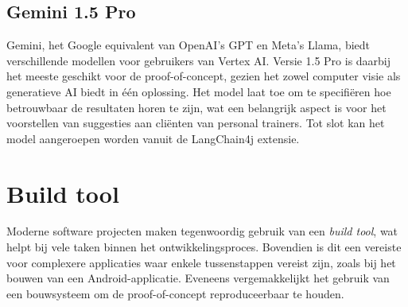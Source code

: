 \subsection{Gemini 1.5 Pro}
\label{subsec:gemini-1.5-pro}
Gemini, het Google equivalent van OpenAI's GPT en Meta's Llama, biedt verschillende modellen voor gebruikers van Vertex AI\@.
Versie 1.5 Pro is daarbij het meeste geschikt voor de proof-of-concept, gezien het zowel computer visie als generatieve AI biedt in één oplossing.
Het model laat toe om te specifiëren hoe betrouwbaar de resultaten horen te zijn, wat een belangrijk aspect is voor het voorstellen van suggesties aan cliënten van personal trainers.
Tot slot kan het model aangeroepen worden vanuit de LangChain4j extensie.

\section{Build tool}
\label{sec:build-tool}
Moderne software projecten maken tegenwoordig gebruik van een \textit{build tool}, wat helpt bij vele taken binnen het ontwikkelingsproces.
Bovendien is dit een vereiste voor complexere applicaties waar enkele tussenstappen vereist zijn, zoals bij het bouwen van een Android-applicatie.
Eveneens vergemakkelijkt het gebruik van een bouwsysteem om de proof-of-concept reproduceerbaar te houden.

